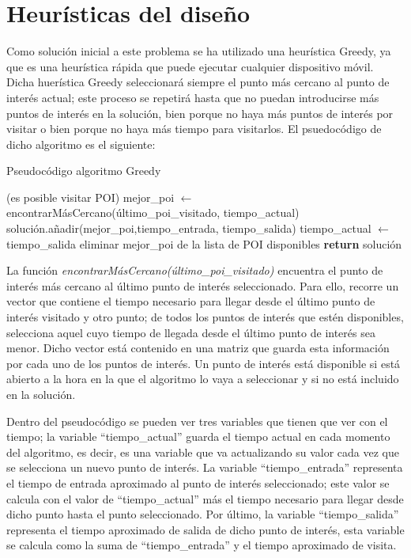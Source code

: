 \section[Heurísticas del diseño]{Heurísticas del diseño}
Como solución inicial a este problema se ha utilizado una heurística Greedy, ya que es una heurística rápida que puede ejecutar cualquier dispositivo móvil. Dicha huerística Greedy seleccionará siempre el punto más cercano al punto de interés actual; este proceso se repetirá hasta que no puedan introducirse más puntos de interés en la solución, bien porque no haya más puntos de interés por visitar o bien porque no haya más tiempo para visitarlos. El psuedocódigo de dicho algoritmo es el siguiente:\newline
\begin{algorithm}[H]
	\caption{Pseudocódigo algoritmo Greedy}
	\label{alg:greedy_alg}
	\begin{algorithmic}
		\While(es posible visitar POI)
		\State mejor\_poi $\gets$ encontrarMásCercano(último\_poi\_visitado, tiempo\_actual) 
		\State solución.añadir(mejor\_poi,tiempo\_entrada, tiempo\_salida)
		\State tiempo\_actual $\gets$ tiempo\_salida
		\State eliminar mejor\_poi de la lista de POI disponibles
		\EndWhile
		\State \textbf{return} solución
		\EndFunction
	\end{algorithmic}
\end{algorithm}
\vspace{0.06in}
La función \textit{encontrarMásCercano(último\_poi\_visitado)} encuentra el punto de interés más cercano al último punto de interés seleccionado. Para ello, recorre un vector que contiene el tiempo necesario para llegar desde el último punto de interés visitado y otro punto; de todos los puntos de interés que estén disponibles, selecciona aquel cuyo tiempo de llegada desde el último punto de interés sea menor. Dicho vector está contenido en una matriz que guarda esta información por cada uno de los puntos de interés. Un punto de interés está disponible si está abierto a la hora en la que el algoritmo lo vaya a seleccionar y si no está incluido en la solución.\newline

Dentro del pseudocódigo se pueden ver tres variables que tienen que ver con el tiempo; la variable \enquote{tiempo\_actual} guarda el tiempo actual en cada momento del algoritmo, es decir, es una variable que va actualizando su valor cada vez que se selecciona un nuevo punto de interés. La variable \enquote{tiempo\_entrada} representa el tiempo de entrada aproximado al punto de interés seleccionado; este valor se calcula con el valor de \enquote{tiempo\_actual} más el tiempo necesario para llegar desde dicho punto hasta el punto seleccionado. Por último, la variable \enquote{tiempo\_salida} representa el tiempo aproximado de salida de dicho punto de interés, esta variable se calcula como la suma de \enquote{tiempo\_entrada} y el tiempo aproximado de visita.\newline

